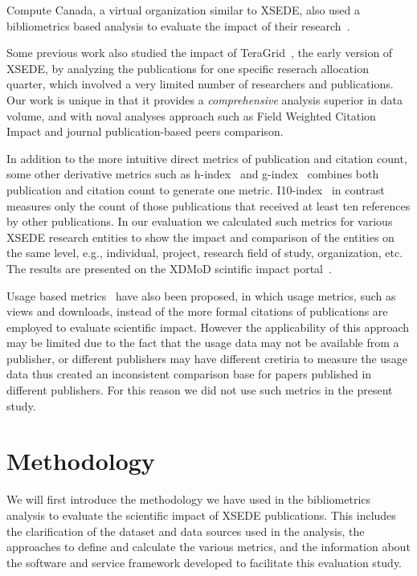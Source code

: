 \documentclass{sig-alternate}
\begin{document}
Compute Canada, a virtual organization similar to XSEDE, also used a
bibliometrics based analysis to evaluate the impact of their
research~\cite{www-computecanada}.

Some previous work also studied the impact of
TeraGrid~\cite{bollen2011and}, the early version of XSEDE, by
analyzing the publications for one specific reserach allocation
quarter, which involved a very limited number of researchers and
publications. Our work is unique in that it provides a {\em
  comprehensive} analysis superior in data volume, and with noval
analyses approach such as Field Weighted Citation Impact and journal
publication-based peers comparison.

In addition to the more intuitive direct metrics of publication and
citation count, some other derivative metrics such as
h-index~\cite{hirsch2005index} and g-index~\cite{egghe2006theory}
combines both publication and citation count to generate one
metric. I10-index~\cite {www-i10index} in contrast measures only the
count of those publications that received at least ten references by
other publications.  In our evaluation we calculated such metrics for
various XSEDE research entities to show the impact and comparison of
the entities on the same level, e.g., individual, project, research
field of study, organization, etc. The results are presented on the
XDMoD scintific impact portal~\cite{www-xdmod-sciimp}.


Usage based
metrics~\cite{Bollen:2007:MUM:1255175.1255273,Bollen:2008:TUI:1378889.1378928}
have also been proposed, in which usage metrics, such as views and
downloads, instead of the more formal citations of publications are
employed to evaluate scientific impact. However the applicability of
this approach may be limited due to the fact that the usage data may
not be available from a publisher, or different publishers may have
different cretiria to measure the usage data thus created an
inconsistent comparison base for papers published in different
publishers.  For this reason we did not use such metrics in the
present study.

\section{Methodology} \label{S:methodology}

We will first introduce the methodology we have used in the
bibliometrics analysis to evaluate the scientific impact of XSEDE
publications. This includes the clarification of the dataset and data
sources used in the analysis, the approaches to define and calculate
the various metrics, and the information about the software and
service framework developed to facilitate this evaluation study.
\end{document}
